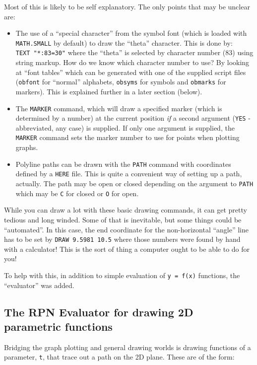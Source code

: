 \documentclass[a4paper,twoside,11pt]{article}
\newcommand{\newpara}{\par\vspace{4mm}\noindent}
\begin{document}
\newpara
Most of this is likely to be self explanatory. The only points that may
be unclear are:

\begin{itemize}
\item
  The use of a ``special character'' from the symbol font (which is
  loaded with \texttt{MATH.SMALL} by default) to draw the ``theta''
  character. This is done by: \texttt{TEXT\ "*:83=30"} where the
  ``theta'' is selected by character number (83) using string markup.
  How do we know which character number to use? By looking at ``font
  tables'' which can be generated with one of the supplied script files
  (\texttt{obfont} for ``normal'' alphabets, \texttt{obsyms} for symbols
  and \texttt{obmarks} for markers). This is explained further in a
  later section (below).
\item
  The \texttt{MARKER} command, which will draw a specified marker (which
  is determined by a number) at the current position \emph{if} a second
  argument (\texttt{YES} - abbreviated, any case) is supplied. If only
  one argument is supplied, the \texttt{MARKER} command sets the marker
  number to use for points when plotting graphs.
\item
  Polyline paths can be drawn with the \texttt{PATH} command with
  coordinates defined by a \texttt{HERE} file. This is quite a
  convenient way of setting up a path, actually. The path may be open
  or closed depending on the argument to \texttt{PATH} which may be
  \texttt{C} for closed or \texttt{O} for open.
\end{itemize}

\newpara
While you can draw a lot with these basic drawing commands, it can get
pretty tedious and long winded. Some of that is inevitable, but some
things could be ``automated''. In this case, the end coordinate for the
non-horizontal ``angle'' line has to be set by
\texttt{DRAW\ 9.5981\ 10.5} where those numbers were found by hand with a
calculator! This is the sort of thing a computer ought to be able to do
for you!

\newpara
To help with this, in addition to simple evaluation of
\texttt{y\ =\ f(x)} functions, the ``evaluator'' was added.


\subsection{The RPN Evaluator for drawing 2D parametric functions}\label{the-rpn-evaluator-for-drawing-2d-parametric-functions}
\newpara
Bridging the graph plotting and general drawing worlds is drawing
functions of a parameter, \texttt{t}, that trace out a path on the 2D
plane. These are of the form:
\end{document}

